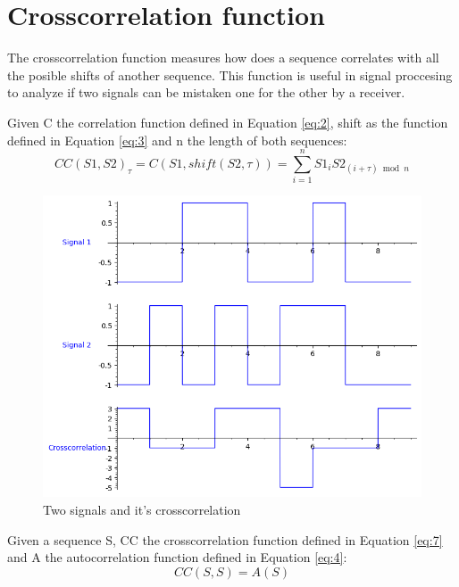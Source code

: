 \section{Crosscorrelation function}

The crosscorrelation function measures how does a sequence correlates with all
the posible shifts of another sequence. This function is useful in signal
proccesing to analyze if two signals can be mistaken one for the other by a
receiver.


\begin{definition}[Crosscorrelation]\label{def:4}
  Given C the correlation function defined in Equation \ref{eq:2}, shift as the function defined in Equation \ref{eq:3} and n the length of both sequences:
  \begin{equation}\label{eq:7}
    CC(S1, S2)_{\tau} = C(S1, shift(S2, \tau)) = \sum_{i=1}^{n}S1_{i}S2_{(i+\tau) \bmod n}
  \end{equation}
\end{definition}

\begin{figure}[ht!] %
\begin{center}
\includegraphics[width=0.7\linewidth]{Chapters/Introduction/signals_crosscorrelation}
\end{center}
\caption{Two signals and it's crosscorrelation}
\label{introduction_signals_crosscorrelation}
\end{figure}

\begin{lemma}\label{lem:1}
  Given a sequence S, CC the crosscorrelation function defined in Equation \ref{eq:7} and A the autocorrelation function defined in Equation \ref{eq:4}:
  \begin{equation}\label{eq:8}
    CC(S, S) = A(S)
  \end{equation}
\end{lemma}












